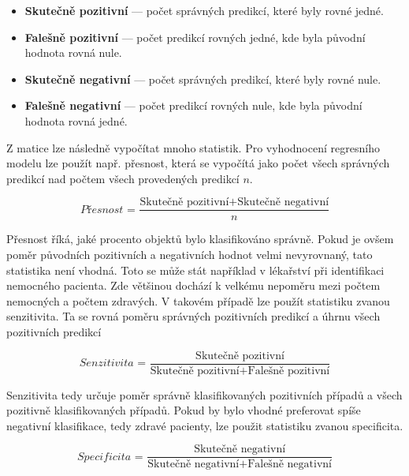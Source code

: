\begin{itemize}
    \item \textbf{Skutečně pozitivní} --- počet správných predikcí, které byly rovné jedné.
    \item \textbf{Falešně pozitivní} --- počet predikcí rovných jedné, kde byla původní hodnota rovná nule.
    \item \textbf{Skutečně negativní} --- počet správných predikcí, které byly rovné nule.
    \item \textbf{Falešně negativní} --- počet predikcí rovných nule, kde byla původní hodnota rovná jedné.
\end{itemize}

Z matice lze následně vypočítat mnoho statistik. Pro vyhodnocení regresního modelu lze použít např. přesnost, která se vypočítá jako počet všech správných predikcí nad
počtem všech provedených predikcí $n$.

\begin{equation}
    \textit{Přesnost = } \frac{\text{Skutečně pozitivní} + \text{Skutečně negativní}}{n}
\end{equation}


Přesnost říká, jaké procento
{\color{red}
objektů
}
bylo klasifikováno správně. Pokud je ovšem poměr původních pozitivních a negativních hodnot velmi nevyrovnaný, tato statistika
není vhodná. Toto se může stát například v lékařství při identifikaci nemocného pacienta. Zde většinou dochází k velkému nepoměru mezi počtem nemocných a počtem zdravých.
V takovém případě lze použít statistiku zvanou senzitivita. Ta se rovná poměru správných pozitivních predikcí a úhrnu všech pozitivních predikcí

\begin{equation}
    \label{eq:senzitivita}
    \textit{Senzitivita = } \frac{\text{Skutečně pozitivní}}{\text{Skutečně pozitivní} + \text{Falešně pozitivní}}
\end{equation}

Senzitivita tedy určuje poměr správně klasifikovaných pozitivních případů a všech pozitivně klasifikovaných případů. Pokud by bylo vhodné preferovat
spíše negativní klasifikace, tedy zdravé pacienty, lze použit statistiku zvanou specificita.

\begin{equation}
    \label{eq:specificita}
    \textit{Specificita = } \frac{\text{Skutečně negativní}}{\text{Skutečně negativní} + \text{Falešně negativní}}
\end{equation}

